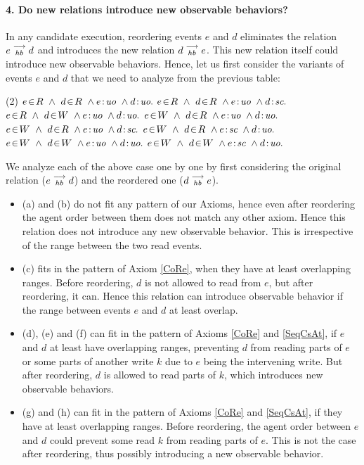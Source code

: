 
\paragraph{4. Do new relations introduce new observable behaviors?}
    In any candidate execution, reordering events $e$ and $d$ eliminates the relation $e\stackrel{\longrightarrow}{_{hb}}d$ and introduces the new relation $d\stackrel{\longrightarrow}{_{hb}}e$.
    This new relation itself could introduce new observable behaviors.  
    Hence, let us first consider the variants of events $e$ and $d$ that we need to analyze from the previous table:
    \begin{tasks}(2)
        \task $\event{e}{R} \ \wedge \ \event{d}{R} \ \wedge \et{e}{uo} \ \wedge \et{d}{uo}.$
        \task $\event{e}{R} \ \wedge \ \event{d}{R} \ \wedge \et{e}{uo} \ \wedge \et{d}{sc}.$
        \task $\event{e}{R} \ \wedge \ \event{d}{W} \ \wedge \et{e}{uo} \ \wedge \et{d}{uo}.$
        \task $\event{e}{W} \ \wedge \ \event{d}{R} \ \wedge \et{e}{uo} \ \wedge \et{d}{uo}.$
        \task $\event{e}{W} \ \wedge \ \event{d}{R} \ \wedge \et{e}{uo} \ \wedge \et{d}{sc}.$
        \task $\event{e}{W} \ \wedge \ \event{d}{R} \ \wedge \et{e}{sc} \ \wedge \et{d}{uo}.$
        \task $\event{e}{W} \ \wedge \ \event{d}{W} \ \wedge \et{e}{uo} \ \wedge \et{d}{uo}.$
        \task $\event{e}{W} \ \wedge \ \event{d}{W} \ \wedge \et{e}{sc} \ \wedge \et{d}{uo}.$
    \end{tasks}

    We analyze each of the above case one by one by first considering the original relation ($e\stackrel{\longrightarrow}{_{hb}}d$) and the reordered one ($d\stackrel{\longrightarrow}{_{hb}}e$). 
    \begin{itemize}
        \item (a) and (b) do not fit any pattern of our Axioms, hence even after reordering the agent order between them does not match any other axiom. Hence this relation does not introduce any new observable behavior. This is irrespective of the range between the two read events.
        \item (c) fits in the pattern of Axiom \ref{CoRe}, when they have at least overlapping ranges. Before reordering, $d$ is not allowed to read from $e$, but after reordering, it can. Hence this relation can introduce observable behavior if the range between events $e$ and $d$ at least overlap. 
        \item (d), (e) and (f) can fit in the pattern of Axioms \ref{CoRe} and \ref{SeqCsAt}, if $e$ and $d$ at least have overlapping ranges, preventing $d$ from reading parts of $e$ or some parts of another write $k$ due to $e$ being the intervening write. But after reordering, $d$ is allowed to read parts of $k$, which introduces new observable behaviors.
        \item (g) and (h) can fit in the pattern of Axioms \ref{CoRe} and \ref{SeqCsAt}, if they have at least overlapping ranges. Before reordering, the agent order between $e$ and $d$ could prevent some read $k$ from reading parts of $e$. This is not the case after reordering, thus possibly introducing a new observable behavior. 
    \end{itemize}

